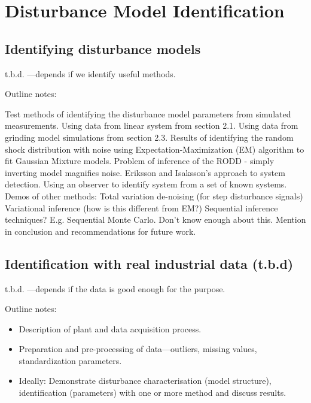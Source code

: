 \chapter{Disturbance Model Identification}
\label{chap-identification}

\section{Identifying disturbance models}

t.b.d. —depends if we identify useful methods.

Outline notes:
\begin{outline}
	\1 Test methods of identifying the disturbance model parameters from simulated measurements.
	\2 Using data from linear system from section 2.1.
	\2 Using data from grinding model simulations from section 2.3.
	\1 Results of identifying the random shock distribution with noise using Expectation-Maximization (EM) algorithm to fit Gaussian Mixture models.
	\1 Problem of inference of the RODD - simply inverting model magnifies noise.
	\1 Eriksson and Isaksson's approach to system detection. Using an observer to identify system from a set of known systems.
	\1 Demos of other methods:
	  \2 Total variation de-noising (for step disturbance signals)
	  \2 Variational inference (how is this different from EM?)
	\1 Sequential inference techniques? E.g. Sequential Monte Carlo. Don't know enough about this. Mention in conclusion and recommendations for future work.
\end{outline}

\section{Identification with real industrial data (t.b.d)}

t.b.d. —depends if the data is good enough for the purpose.

Outline notes:
\begin{itemize}
	\item Description of plant and data acquisition process.
	\item Preparation and pre-processing of data—outliers, missing values, standardization parameters.
	\item Ideally: Demonstrate disturbance characterisation (model structure), identification (parameters) with one or more method and discuss results. 
\end{itemize}